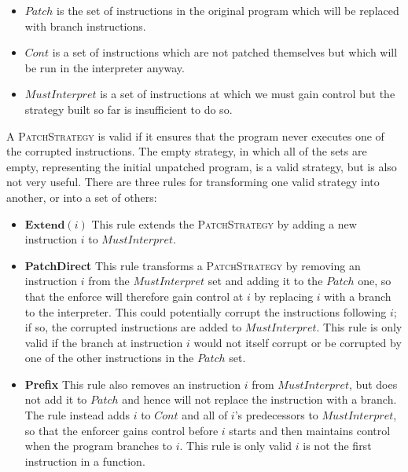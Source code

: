 \begin{itemize}
\item $\mathit{Patch}$ is the set of instructions in the original
  program which will be replaced with branch instructions.
\item $\mathit{Cont}$ is a set of instructions which are not patched
  themselves but which will be run in the interpreter anyway.
\item $\mathit{MustInterpret}$ is a set of instructions at which we
  must gain control but the strategy built so far is insufficient to
  do so.
\end{itemize}

A \textsc{PatchStrategy} is valid if it ensures that the program never
executes one of the corrupted instructions.  The empty strategy, in
which all of the sets are empty, representing the initial unpatched
program, is a valid strategy, but is also not very useful.  There are
three rules for transforming one valid strategy into another, or into
a set of others:

\begin{itemize}
\item
  $\textbf{Extend}(i)$ This rule extends the \textsc{PatchStrategy} by
  adding a new instruction $i$ to $\mathit{MustInterpret}$.
\item
  \textbf{PatchDirect} This rule transforms a \textsc{PatchStrategy}
  by removing an instruction $i$ from the $\mathit{MustInterpret}$ set
  and adding it to the $\mathit{Patch}$ one, so that the enforce will
  therefore gain control at $i$ by replacing $i$ with a branch to the
  interpreter.  This could potentially corrupt the instructions
  following $i$; if so, the corrupted instructions are added to
  $\mathit{MustInterpret}$.  This rule is only valid if the branch at
  instruction $i$ would not itself corrupt or be corrupted by one of
  the other instructions in the $\mathit{Patch}$ set.
\item
  \textbf{Prefix} This rule also removes an instruction $i$ from
  $\mathit{MustInterpret}$, but does not add it to $\mathit{Patch}$
  and hence will not replace the instruction with a branch.  The rule
  instead adds $i$ to $\mathit{Cont}$ and all of $i$'s predecessors to
  $\mathit{MustInterpret}$, so that the enforcer gains control before
  $i$ starts and then maintains control when the program branches to
  $i$.  This rule is only valid $i$ is not the first instruction in a
  function.
\end{itemize}

